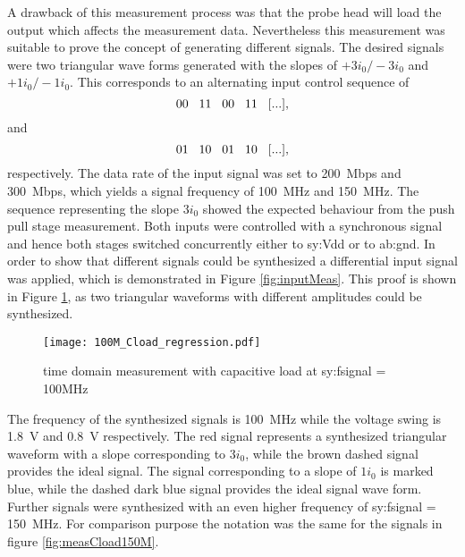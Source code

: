 A drawback of this measurement process was that the probe head will load the output which affects the measurement data.
Nevertheless this measurement was suitable to prove the concept of generating different signals.
The desired signals were two triangular wave forms generated with the slopes of $+3 i_0 / -3 i_0$ and $+1 i_0 / -1 i_0$.
This corresponds to an alternating input control sequence of 
\begin{equation}
 00\hspace{.3cm} 11\hspace{.3cm} 00\hspace{.3cm} 11\hspace{.3cm} [...],
\end{equation}
and
\begin{equation}
 01\hspace{.3cm} 10\hspace{.3cm} 01\hspace{.3cm} 10\hspace{.3cm} [...],
\end{equation}
respectively.
The data rate of the input signal was set to \SI{200}{Mbps} and \SI{300}{Mbps}, which yields a signal frequency of \SI{100}{\mega \hertz} and \SI{150}{\mega \hertz}.
The sequence representing the slope $3 i_0$ showed the expected behaviour from the push pull stage measurement.
Both inputs were controlled with a synchronous signal and hence both stages switched concurrently either to \gls{sy:Vdd} or to \gls{ab:gnd}.
In order to show that different signals could be synthesized a differential input signal was applied, which is demonstrated in Figure \ref{fig:inputMeas}.
This proof is shown in Figure \ref{fig:measCload100M}, as two triangular waveforms with different amplitudes could be synthesized.

\begin{figure}[htb!]
	\centering
  \texttt{[image: 100M\_Cload\_regression.pdf]}
	\caption{time domain measurement with capacitive load at \gls{sy:fsignal} = 100MHz}
	\label{fig:measCload100M}
\end{figure}

The frequency of the synthesized signals is \SI{100}{\mega \hertz} while the voltage swing is \SI{1.8}{\volt} and \SI{0.8}{\volt} respectively.
The red signal represents a synthesized triangular waveform with a slope corresponding to $3 i_0$, while the brown dashed signal provides the ideal signal.
The signal corresponding to a slope of $1 i_0$ is marked blue, while the dashed dark blue signal provides the ideal signal wave form.
Further signals were synthesized with an even higher frequency of \gls{sy:fsignal} = \SI{150}{\mega \hertz}.
For comparison purpose the notation was the same for the signals in figure \ref{fig:measCload150M}.

